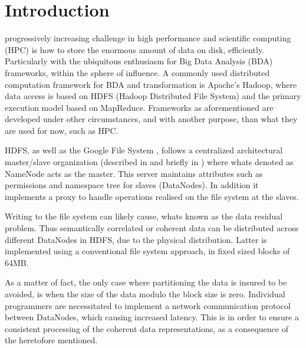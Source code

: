 \chapter{Introduction} \label{chap:introduction}

 progressively increasing challenge in high performance and scientific computing (HPC) is how to store the enormous amount of data on disk, efficiently. Particularly with the ubiquitous enthusiasm for Big Data Analysis (BDA) frameworks, within the sphere of influence. A commonly used distributed computation framework for BDA and transformation is Apache's Hadoop\cite{PageHadoop}, where data access is based on HDFS (Hadoop Distributed File System) \cite{Shvachko:2010:HDF:1913798.1914427} and the primary execution model based on MapReduce\cite{Dean:2008:MSD:1327452.1327492}. Frameworks as aforementioned are developed under other circumstances, and with another purpose, than what they are used for now, such as HPC. 
\newline

HDFS, as well as the Google File System \cite{Ghemawat:2003:GFS:945445.945450}, follows a centralized architectural master/slave organization (described in \eg \cite{Tanenbaum:2006:DSP:1202502} and briefly in \cite{Wilkinson:1998:PPT:289352}) where whats denoted as NameNode acts as the master. This server maintains attributes such as permissions and namespace tree for slaves (DataNodes). In addition it implements a proxy to handle operations realised on the file system at the slaves. 
\newline

Writing to the file system can likely cause, whats known as the data residual problem. Thus semantically correlated or coherent data can be distributed across different DataNodes in HDFS, due to the physical distribution. Latter is implemented using a conventional file system approach, \ie in fixed sized blocks of 64MB. 
\newpage

As a matter of fact, the only case where partitioning the data is insured to be avoided, is when the size of the data modulo the block size is zero. Individual programmers are necessitated to implement a network communication protocol  between DataNodes, which causing increased latency. This is in order to ensure a consistent processing of the coherent data representations, as a consequence of the heretofore mentioned.
\newline


